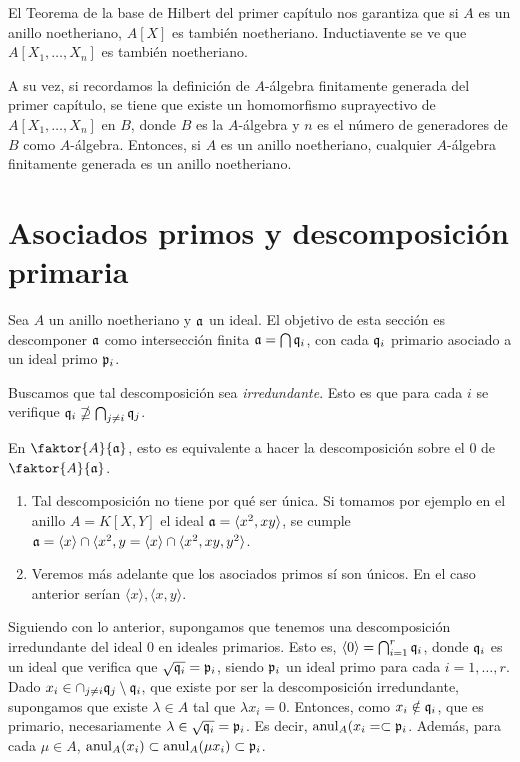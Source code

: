 \documentclass[../main.tex]{subfiles}
\begin{document}
	El Teorema de la base de Hilbert del primer capítulo nos garantiza que si $A$ es un anillo noetheriano, $A[X]$ es también noetheriano. Inductiavente se ve que $A[X_1,\dots,X_n]$ es también noetheriano. 
	
	A su vez, si recordamos la definición de $A$-álgebra finitamente generada del primer capítulo, se tiene que existe un homomorfismo suprayectivo de $A[X_1,\dots,X_n]$ en $B$, donde $B$ es la $A$-álgebra y $n$ es el número de generadores de $B$ como $A$-álgebra. Entonces, si $A$ es un anillo noetheriano, cualquier $A$-álgebra finitamente generada es un anillo noetheriano.
	
	\section{Asociados primos y descomposición primaria}
	Sea $A$ un anillo noetheriano y $\mathfrak{a}$ un ideal. El objetivo de esta sección es descomponer $\mathfrak{a}$ como intersección finita $\mathfrak{a}=\bigcap \mathfrak{q}_i$, con cada $\mathfrak{q}_i$ primario asociado a un ideal primo $\mathfrak{p}_i$.
	
	Buscamos que tal descomposición sea \textit{irredundante}. Esto es que para cada $i$ se verifique $\mathfrak{q}_i\nsupseteq \bigcap_{j\neq i}\mathfrak{q}_j$.
	
	En $\faktor{A}{\af}$, esto es equivalente a hacer la descomposición sobre el $0$ de $\faktor{A}{\af}$.
	
	\begin{remark}
		\begin{enumerate}
			\item Tal descomposición no tiene por qué ser única. Si tomamos por ejemplo en el anillo $A=K[X,Y]$ el ideal $\mathfrak{a}=\langle x^2,xy\rangle$, se cumple $\mathfrak{a}=\langle x\rangle\cap\langle x^2,y=\langle x\rangle\cap\langle x^2,xy,y^2\rangle$.
			\item  Veremos más adelante que los asociados primos sí son únicos. En el caso anterior serían $\langle x\rangle, \langle x,y\rangle$.
		\end{enumerate}
	\end{remark}
	Siguiendo con lo anterior, supongamos que tenemos una descomposición irredundante del ideal $0$ en ideales primarios. Esto es, $\langle 0\rangle=\bigcap_{i=1}^r\mathfrak{q}_i$, donde $\mathfrak{q}_i$ es un ideal que verifica que $\sqrt{\mathfrak{q}_i}=\mathfrak{p}_i$, siendo $\mathfrak{p}_i$ un ideal primo para cada $i=1,\dots,r$. Dado $x_i\in\cap_{j\neq i}\mathfrak{q}_j\setminus\mathfrak{q}_i$, que existe por ser la descomposición irredundante, supongamos que existe $\lambda\in A$ tal que $\lambda x_i=0$. Entonces, como $x_i\notin\mathfrak{q}_i$, que es primario, necesariamente $\lambda\in\sqrt{\mathfrak{q}_i}=\mathfrak{p}_i$. Es decir, $\operatorname{anul}_A(x_i=\subset\mathfrak{p}_i$. Además, para cada $\mu\in A$, $\operatorname{anul}_A(x_i)\subset\operatorname{anul}_A(\mu x_i)\subset\mathfrak{p}_i$. 
	
\end{document}
